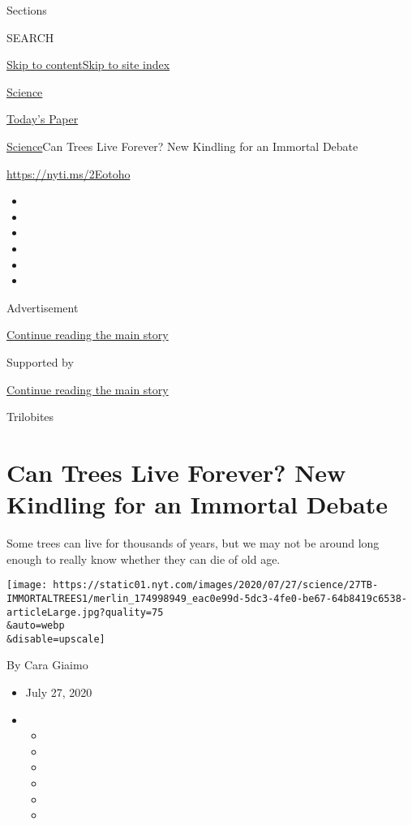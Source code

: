 Sections

SEARCH

\protect\hyperlink{site-content}{Skip to
content}\protect\hyperlink{site-index}{Skip to site index}

\href{https://www.nytimes.com/section/science}{Science}

\href{https://myaccount.nytimes.com/auth/login?response_type=cookie\&client_id=vi}{}

\href{https://www.nytimes.com/section/todayspaper}{Today's Paper}

\href{/section/science}{Science}\textbar{}Can Trees Live Forever? New
Kindling for an Immortal Debate

\url{https://nyti.ms/2Eotoho}

\begin{itemize}
\item
\item
\item
\item
\item
\item
\end{itemize}

Advertisement

\protect\hyperlink{after-top}{Continue reading the main story}

Supported by

\protect\hyperlink{after-sponsor}{Continue reading the main story}

Trilobites

\hypertarget{can-trees-live-forever-new-kindling-for-an-immortal-debate}{%
\section{Can Trees Live Forever? New Kindling for an Immortal
Debate}\label{can-trees-live-forever-new-kindling-for-an-immortal-debate}}

Some trees can live for thousands of years, but we may not be around
long enough to really know whether they can die of old age.

\texttt{[image: https://static01.nyt.com/images/2020/07/27/science/27TB-IMMORTALTREES1/merlin\_174998949\_eac0e99d-5dc3-4fe0-be67-64b8419c6538-articleLarge.jpg?quality=75\\\&auto=webp\\\&disable=upscale]}

By Cara Giaimo

\begin{itemize}
\item
  July 27, 2020
\item
  \begin{itemize}
  \item
  \item
  \item
  \item
  \item
  \item
  \end{itemize}
\end{itemize}

